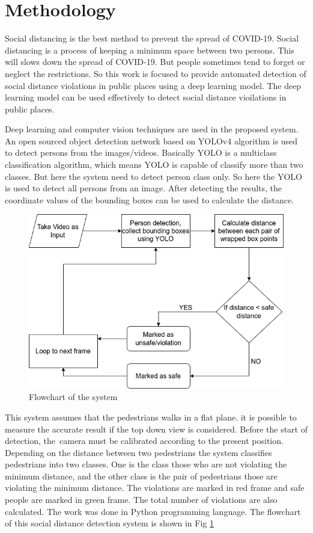 \documentclass[conference]{IEEEtran}
\begin{document}
\section{Methodology}
Social distancing is the best method to prevent the spread of COVID-19. Social distancing is a process of keeping a minimum space between two persons. This will slows down the spread of COVID-19. But people sometimes tend to forget or neglect the restrictions. So this work is focused to provide automated detection of social distance violations in public places using a deep learning model. The deep learning model can be used effectively to detect social distance vioilations in public places.
\par 
Deep learning and computer vision techniques are used in the proposed system. An open sourced object detection network based on YOLOv4 \cite{yolov4} algorithm is used to detect persons from the images/videos. Basically YOLO is a multiclass classification algorithm, which means YOLO is capable of classify more than two classes. But here the system need to detect person class only. So here the YOLO is used to detect all persons \cite{10} from an image. After detecting the results, the coordinate values of the bounding boxes can be used to calculate the distance. 
\par
\begin{figure}[!h]
	\includegraphics[width=\columnwidth]{./images/flowchart.png}
	\caption{Flowchart of the system}
	\label{pipeline}
\end{figure} 
This system assumes that the pedestrians walks in a flat plane. it is possible to measure the accurate result if the top down view is considered. Before the start of detection, the camera must be calibrated according to the present position. Depending on the distance between two pedestrians the system classifies pedestrians into two classes. One is the class those who are not violating the minimum distance, and the other class is the pair of pedestrians those are violating the minimum distance. The violations are marked in red frame and safe people are marked in green frame. The total number of violations are also calculated. The work was done in Python programming language. The flowchart of this social distance detection system is shown in Fig \ref{pipeline}
\end{document}
